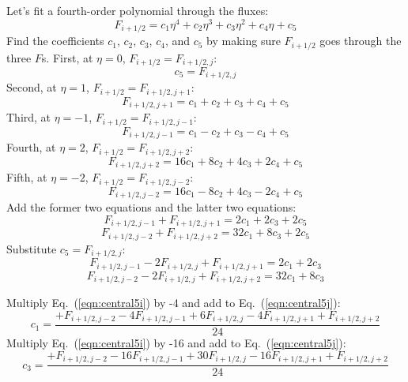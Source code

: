 \documentclass{warpdoc}
\begin{document}
Let's fit a fourth-order polynomial through the fluxes:
%
\begin{equation}
F_{i+1/2}=c_1 \eta^4 + c_2 \eta^3 + c_3 \eta^2 + c_4 \eta + c_5 
\label{eqn:central5a}
\end{equation}
% 
Find the coefficients $c_1$, $c_2$, $c_3$, $c_4$, and $c_5$ by making sure $F_{i+1/2}$ goes through the three $F$s. First, at $\eta=0$, $F_{i+1/2}=F_{i+1/2,j}$:
%
\begin{equation}
c_5=F_{i+1/2,j}
\label{eqn:central5_c5}
\end{equation}
%
Second, at $\eta=1$, $F_{i+1/2}=F_{i+1/2,j+1}$:
%
\begin{equation}
F_{i+1/2,j+1}=c_1  + c_2  + c_3  + c_4  + c_5 
\label{eqn:central5c}
\end{equation}
% 
Third, at $\eta=-1$, $F_{i+1/2}=F_{i+1/2,j-1}$:
%
\begin{equation}
F_{i+1/2,j-1}=c_1  - c_2  + c_3  - c_4  + c_5 
\label{eqn:central5d}
\end{equation}
% 
Fourth, at $\eta=2$, $F_{i+1/2}=F_{i+1/2,j+2}$:
%
\begin{equation}
F_{i+1/2,j+2}= 16 c_1 + 8 c_2 + 4 c_3 + 2 c_4 + c_5 
\label{eqn:central5e}
\end{equation}
% 
Fifth, at $\eta=-2$, $F_{i+1/2}=F_{i+1/2,j-2}$:
%
\begin{equation}
F_{i+1/2,j-2}= 16 c_1 - 8 c_2 + 4 c_3 - 2 c_4 + c_5 
\label{eqn:central5f}
\end{equation}
% 
Add the former two equations and the latter two equations:
%
\begin{equation}
F_{i+1/2,j-1}+F_{i+1/2,j+1} = 2 c_1    + 2 c_3   + 2 c_5 
\label{eqn:central5g}
\end{equation}
% 
%
\begin{equation}
F_{i+1/2,j-2}+F_{i+1/2,j+2} = 32 c_1  + 8 c_3  + 2 c_5 
\label{eqn:central5h}
\end{equation}
% 
Substitute $c_5=F_{i+1/2,j}$:
%
\begin{equation}
F_{i+1/2,j-1}- 2 F_{i+1/2,j}+F_{i+1/2,j+1} = 2 c_1    + 2 c_3    
\label{eqn:central5i}
\end{equation}
% 
%
\begin{equation}
F_{i+1/2,j-2}- 2 F_{i+1/2,j}+F_{i+1/2,j+2} = 32 c_1  + 8 c_3   
\label{eqn:central5j}
\end{equation}
% 



Multiply Eq.\ (\ref{eqn:central5i}) by -4 and add to Eq.\ (\ref{eqn:central5j}):
%
\begin{equation}
 c_1= \frac{+F_{i+1/2,j-2} -4 F_{i+1/2,j-1}+ 6 F_{i+1/2,j} -4 F_{i+1/2,j+1} +F_{i+1/2,j+2}}{24}   
\label{eqn:central5_c1}
\end{equation}
% 
Multiply Eq.\ (\ref{eqn:central5i}) by -16 and add to Eq.\ (\ref{eqn:central5j}):
%
\begin{equation}
c_3=\frac{+ F_{i+1/2,j-2} -16 F_{i+1/2,j-1}+ 30 F_{i+1/2,j} -16 F_{i+1/2,j+1} 
+F_{i+1/2,j+2}}{24}   
\label{eqn:central5_c3}
\end{equation}
% 
\end{document}

